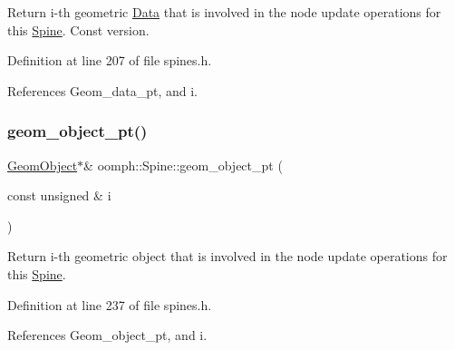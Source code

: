 Return i-\/th geometric \hyperlink{classoomph_1_1Data}{Data} that is involved in the node update operations for this \hyperlink{classoomph_1_1Spine}{Spine}. Const version. 



Definition at line 207 of file spines.\+h.



References Geom\+\_\+data\+\_\+pt, and i.

\mbox{\label{classoomph_1_1Spine_a68253ccfbfdf33e773dd300dcc4ec42c}} 
\subsubsection{\texorpdfstring{geom\+\_\+object\+\_\+pt()}{geom\_object\_pt()}\hspace{0.1cm}{\footnotesize\ttfamily [1/2]}}
{\footnotesize\ttfamily \hyperlink{classoomph_1_1GeomObject}{Geom\+Object}$\ast$\& oomph\+::\+Spine\+::geom\+\_\+object\+\_\+pt (\begin{DoxyParamCaption}\item[{const unsigned \&}]{i }\end{DoxyParamCaption})\hspace{0.3cm}{\ttfamily [inline]}}



Return i-\/th geometric object that is involved in the node update operations for this \hyperlink{classoomph_1_1Spine}{Spine}. 



Definition at line 237 of file spines.\+h.



References Geom\+\_\+object\+\_\+pt, and i.



